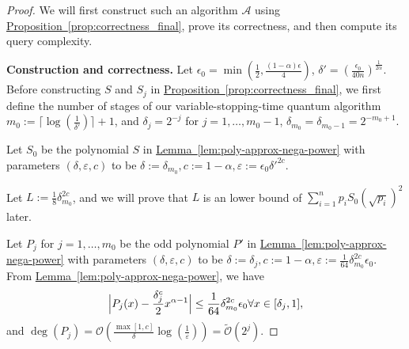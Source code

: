 \documentclass[journal]{IEEEtran}
\newcommand{\lem}[1]{\hyperref[lem:#1]{Lemma~\ref*{lem:#1}}}
\newcommand{\prop}[1]{\hyperref[prop:#1]{Proposition~\ref*{prop:#1}}}
\begin{document}
\begin{proof}
We will first construct such an algorithm $\mathcal{A}$ using \prop{correctness_final}, prove its correctness, and then compute its query complexity.

\noindent
\textbf{Construction and correctness.}
  Let $\epsilon_0 = \min(\frac{1}{2},\frac{(1-\alpha)\epsilon}{4})$, $\delta' = \left(\frac{\epsilon_0}{40n}\right)^{\frac{1}{2\alpha}}$. 
  Before constructing $S$ and $S_j$ in \prop{correctness_final}, we first define the number of stages of our variable-stopping-time quantum algorithm $m_0:=\lceil \log(\frac{1}{\delta'})\rceil+1$, and $\delta_j = 2^{-j}$ for $j = 1,\ldots, m_0-1$, $\delta_{m_0} = \delta_{m_0-1} = 2^{-m_0+1}$.

    Let $S_0$ be the polynomial $S$ in \lem{poly-approx-nega-power} with parameters $(\delta, \varepsilon, c)$ to be $\delta := \delta_{m_0},c := 1-\alpha,\varepsilon := \epsilon_{0}\delta'^{2c}$.
    
    Let $L := \frac{1}{8}\delta_{m_0}^{2c}$, and we will prove that $L$ is an lower bound of $\sum_{i=1}^n p_i S_0(\sqrt{p_i})^2$ later.

    Let $P_j$ for $j=1,\ldots, m_0$ be the odd polynomial $P'$ in \lem{poly-approx-nega-power} with parameters $(\delta, \varepsilon, c)$ to be $\delta := \delta_j,c := 1-\alpha,\varepsilon := \frac{1}{64}\delta_{m_0}^{2c}\epsilon_{0}$. From \lem{poly-approx-nega-power}, we have
    \begin{align}
    \label{eq:equation_P_j}
        \Bigl|P_j(x)-\frac{\delta_j^{c}}{2}x^{\alpha-1}\Bigr| \le \frac{1}{64}\delta_{m_0}^{2c}\epsilon_{0}\forall x\in [\delta_j,1],
    \end{align}
    and $\deg(P_j) = \mathcal{O}\left(\frac{\max [1, c]}{\delta} \log \left(\frac{1}{\varepsilon}\right)\right) = \widetilde{\mathcal{O}}(2^j)$. 


\end{proof}
\end{document}

